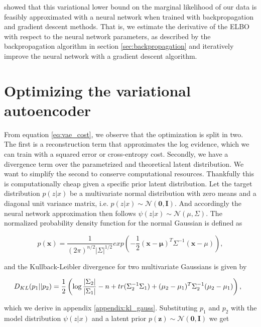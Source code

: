 \citet{Kingma2013} showed that this variational lower bound on the marginal likelihood of our data is feasibly approximated with a neural network when trained with backpropagation and gradient descent methods. That is, we estimate the derivative of the ELBO with respect to the neural network parameters, as described by the backpropagation algorithm in section \ref{sec:backpropagation} and iteratively improve the neural network with a gradient descent algorithm.

\section{Optimizing the variational autoencoder}\label{sec:vae_opt}

From equation \ref{eq:vae_cost}, we observe that the optimization is split in two. The first is a reconstruction term that approximates the log evidence, which we can train with a squared error or cross-entropy cost. Secondly, we have a divergence term over the parametrized and theoretical latent distribution. We want to simplify the second to conserve computational resources. Thankfully this is computationally cheap given a specific prior latent distribution. Let the target distribution $p(z | x) $ be a multivariate normal distribution with zero means and a diagonal unit variance matrix, i.e. $p(z | x) \sim  \mathcal{N}(\boldsymbol{0}, \boldsymbol{I})$. And accordingly the neural network approximation then follows $\psi(z | x) \sim \mathcal{N}(\mu, \Sigma)$. The normalized probability density function for the normal Gaussian is defined as 

\begin{equation}
p(\boldsymbol{x}) = \frac{1}{(2\pi)^{n/2}|\Sigma|^{1/2}}exp(-\frac{1}{2}(\boldsymbol{x} - \mathbf{\mu})^T\Sigma^{-1}(\boldsymbol{x}-\mu)),
\end{equation}

\noindent and the Kullback-Leibler divergence for two multivariate Gaussians is given by 


\begin{equation}
\hspace*{-0.1in}
D_{KL}(p_1|| p_2 ) = \frac{1}{2} \left( \log \frac{|\Sigma_2|}{|\Sigma_1|} -n + tr(\Sigma^{-1}_2 \Sigma_1) + (\mu_2 - \mu_1)^T\Sigma_2^{-1}(\mu_2 - \mu_1) \right),
\end{equation}

\noindent which we derive in appendix \ref{appendix:kl_gauss}. Substituting $p_1$ and $p_2$ with the model distribution $\psi(z|x)$ and a latent prior $p(\boldsymbol{z}) \sim \mathcal{N}(\boldsymbol{0}, \boldsymbol{I})$ we get 

